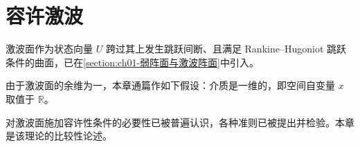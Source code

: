 \documentclass[../main.tex]{subfiles}
\begin{document}
\chapter{容许激波}\label{chapter:ch08-容许激波}

激波面作为状态向量 $U$ 跨过其上发生跳跃间断、且满足 Rankine--Hugoniot 跳跃条件的曲面，已在\cref{section:ch01-弱阵面与激波阵面}中引入。

由于激波面的余维为一，本章通篇作如下假设：介质是一维的，即空间自变量 $x$ 取值于 $\mathbb R$。

对激波面施加容许性条件的必要性已被普遍认识，各种准则已被提出并检验。本章是该理论的比较性论述。









\end{document}
